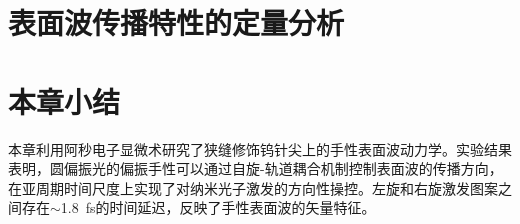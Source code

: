 \section{表面波传播特性的定量分析}
\label{sec:r1-analysis}


\section{本章小结}
\label{sec:r1-summary}

本章利用阿秒电子显微术研究了狭缝修饰钨针尖上的手性表面波动力学。实验结果表明，圆偏振光的偏振手性可以通过自旋-轨道耦合机制控制表面波的传播方向，在亚周期时间尺度上实现了对纳米光子激发的方向性操控。左旋和右旋激发图案之间存在$\sim$\SI{1.8}{fs}的时间延迟，反映了手性表面波的矢量特征。
